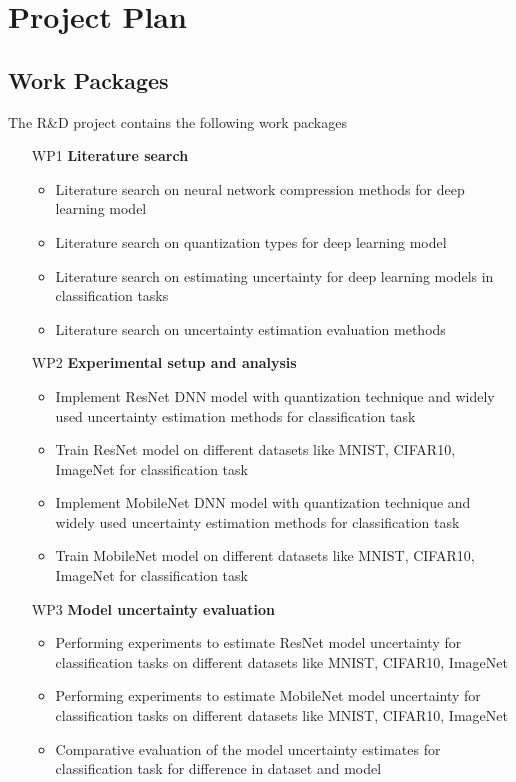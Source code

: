 \documentclass[rnd]{mas_proposal}
\begin{document}
\section{Project Plan}
\subsection{Work Packages}
The R\&D project contains the following work packages
\begin{enumerate}
    \item[WP1] \textbf{Literature search}
        \begin{itemize}
        \item Literature search on neural network compression methods for deep learning model
        \item Literature search on quantization types for deep learning model
        \item Literature search on estimating uncertainty for deep learning models in classification tasks
        \item Literature search on uncertainty estimation evaluation methods
        \end{itemize}
        
    \item[WP2] \textbf{Experimental setup and analysis}
        \begin{itemize}
        \item Implement ResNet DNN model with quantization technique and widely used uncertainty estimation methods for classification task
        \item Train ResNet model on different datasets like MNIST, CIFAR10, ImageNet for classification task
        \item Implement MobileNet DNN model with quantization technique and widely used uncertainty estimation methods for classification task
        \item Train MobileNet model on different datasets like MNIST, CIFAR10, ImageNet for classification task
        \end{itemize}
        
    \item[WP3] \textbf{Model uncertainty evaluation}
        \begin{itemize}
        \item Performing experiments to estimate ResNet model uncertainty for classification tasks on different datasets like MNIST, CIFAR10, ImageNet
        \item Performing experiments to estimate MobileNet model uncertainty for classification tasks on different datasets like MNIST, CIFAR10, ImageNet
        \item Comparative evaluation of the model uncertainty estimates for classification task for difference in dataset and model
        \end{itemize}
        

\end{enumerate}
\end{document}
